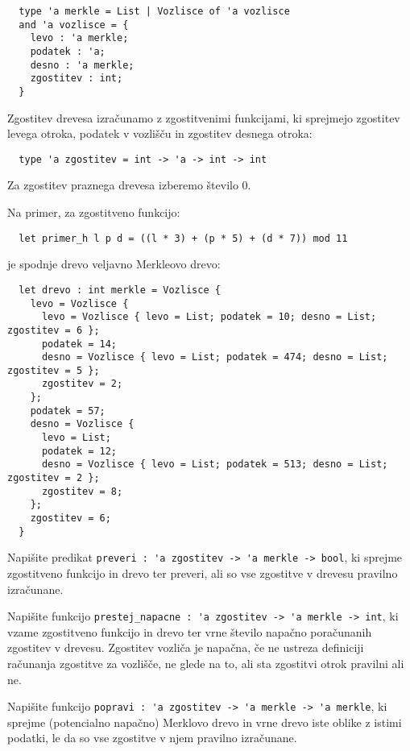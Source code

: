 \documentclass[arhiv]{../izpit}
\begin{document}
\begin{verbatim}
  type 'a merkle = List | Vozlisce of 'a vozlisce
  and 'a vozlisce = {
    levo : 'a merkle;
    podatek : 'a;
    desno : 'a merkle;
    zgostitev : int;
  }
\end{verbatim}

Zgostitev drevesa izračunamo z zgostitvenimi funkcijami, ki sprejmejo zgostitev levega otroka, podatek v vozlišču in zgostitev desnega otroka:
\begin{verbatim}
  type 'a zgostitev = int -> 'a -> int -> int
\end{verbatim}
Za zgostitev praznega drevesa izberemo število 0.

Na primer, za zgostitveno funkcijo:
\begin{verbatim}
  let primer_h l p d = ((l * 3) + (p * 5) + (d * 7)) mod 11
\end{verbatim}
je spodnje drevo veljavno Merkleovo drevo:
\begin{verbatim}
  let drevo : int merkle = Vozlisce {
    levo = Vozlisce {
      levo = Vozlisce { levo = List; podatek = 10; desno = List; zgostitev = 6 };
      podatek = 14;
      desno = Vozlisce { levo = List; podatek = 474; desno = List; zgostitev = 5 };
      zgostitev = 2;
    };
    podatek = 57;
    desno = Vozlisce {
      levo = List;
      podatek = 12;
      desno = Vozlisce { levo = List; podatek = 513; desno = List; zgostitev = 2 };
      zgostitev = 8;
    };
    zgostitev = 6;
  }
\end{verbatim}

\podnaloga
  Napišite predikat \verb|preveri : 'a zgostitev -> 'a merkle -> bool|, ki sprejme zgostitveno funkcijo in drevo ter preveri, ali so vse zgostitve v drevesu pravilno izračunane.

\podnaloga
  Napišite funkcijo \verb|prestej_napacne : 'a zgostitev -> 'a merkle -> int|, ki vzame zgostitveno funkcijo in drevo ter vrne število napačno poračunanih zgostitev v drevesu. Zgostitev vozliča je napačna, če ne ustreza definiciji računanja zgostitve za vozlišče, ne glede na to, ali sta zgostitvi otrok pravilni ali ne.

\podnaloga
  Napišite funkcijo \verb|popravi : 'a zgostitev -> 'a merkle -> 'a merkle|, ki sprejme (potencialno napačno) Merklovo drevo in vrne drevo iste oblike z istimi podatki, le da so vse zgostitve v njem pravilno izračunane.


\naloga
\end{document}
